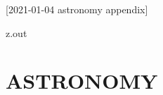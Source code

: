 [2021-01-04 astronomy appendix]

\begin{VerbatimOut}{z.out}

\chapter{ASTRONOMY}

\end{VerbatimOut}

\MyIO
